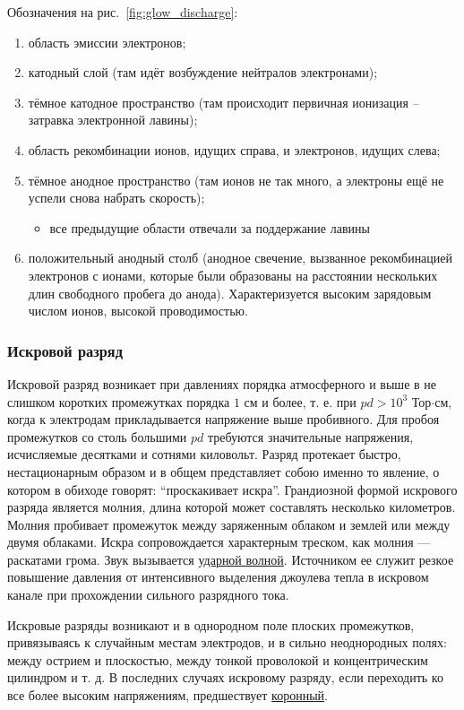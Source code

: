 \documentclass[10pt, a4paper]{article}
\begin{document}
Обозначения на рис.~\ref{fig:glow_discharge}: 

\begin{enumerate}
	\item область эмиссии электронов;
	\item катодный слой (там идёт возбуждение нейтралов электронами);
	\item тёмное катодное пространство (там происходит первичная ионизация -- затравка электронной лавины);
	\item область рекомбинации ионов, идущих справа, и электронов, идущих слева;
	\item тёмное анодное пространство (там ионов не так много, а электроны ещё не успели снова набрать скорость);
	\begin{itemize}
		\item все предыдущие области отвечали за поддержание лавины
	\end{itemize}
	\item положительный анодный столб (анодное свечение, вызванное рекомбинацией электронов с ионами, которые были образованы на расстоянии нескольких длин свободного пробега до анода). Характеризуется высоким зарядовым числом ионов, высокой проводимостью.
\end{enumerate}

\subsubsection{Искровой разряд}

Искровой разряд возникает при давлениях порядка атмосферного и выше в не слишком коротких промежутках порядка $1$ см и более, т. е. при $pd>10^3$ Тор$\cdot$см, когда к электродам прикладывается напряжение выше пробивного. Для пробоя промежутков со столь большими $pd$ требуются значительные напряжения, исчисляемые десятками и сотнями киловольт. Разряд протекает быстро, нестационарным образом и в общем представляет собою именно то явление, о котором в обиходе говорят: ``проскакивает искра''. Грандиозной формой искрового разряда является молния, длина которой может составлять несколько километров. Молния пробивает промежуток между заряженным облаком и землей или между двумя облаками. Искра сопровождается характерным треском, как молния — раскатами грома. Звук вызывается \uline{ударной волной}. Источником ее служит резкое повышение давления от интенсивного выделения джоулева тепла в искровом канале при прохождении сильного разрядного тока.

Искровые разряды возникают и в однородном поле плоских промежутков, привязываясь к случайным местам электродов, и в сильно неоднородных полях: между острием и плоскостью, между тонкой проволокой и концентрическим цилиндром и т. д. В последних случаях искровому разряду, если переходить ко все более высоким напряжениям, предшествует \uline{коронный}.
\end{document}

